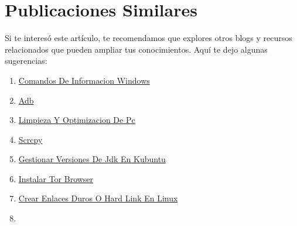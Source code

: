 \documentclass[
  jou,
  floatsintext,
  longtable,
  a4paper,
  nolmodern,
  notxfonts,
  notimes,
  12pt,
  colorlinks=true,linkcolor=blue,citecolor=blue,urlcolor=blue]{apa7}
\providecommand{\tightlist}{%
  \setlength{\itemsep}{0pt}\setlength{\parskip}{0pt}}
\begin{document}
\section{Publicaciones Similares}\label{publicaciones-similares}

Si te interesó este artículo, te recomendamos que explores otros blogs y
recursos relacionados que pueden ampliar tus conocimientos. Aquí te dejo
algunas sugerencias:

\begin{enumerate}
\def\labelenumi{\arabic{enumi}.}
\tightlist
\item
  \href{https://chaska-x.netlify.app/operating-system/2017-05-21-comandos-de-informacion-windows/index.pdf}{}
  \href{https://chaska-x.netlify.app/operating-system/2017-05-21-comandos-de-informacion-windows}{Comandos
  De Informacion Windows}
\item
  \href{https://chaska-x.netlify.app/operating-system/2019-06-19-adb/index.pdf}{}
  \href{https://chaska-x.netlify.app/operating-system/2019-06-19-adb}{Adb}
\item
  \href{https://chaska-x.netlify.app/operating-system/2021-08-17-limpieza-y-optimizacion-de-pc/index.pdf}{}
  \href{https://chaska-x.netlify.app/operating-system/2021-08-17-limpieza-y-optimizacion-de-pc}{Limpieza
  Y Optimizacion De Pc}
\item
  \href{https://chaska-x.netlify.app/operating-system/2021-10-21-scrcpy/index.pdf}{}
  \href{https://chaska-x.netlify.app/operating-system/2021-10-21-scrcpy}{Scrcpy}
\item
  \href{https://chaska-x.netlify.app/operating-system/2022-05-12-gestionar-versiones-de-jdk-en-kubuntu/index.pdf}{}
  \href{https://chaska-x.netlify.app/operating-system/2022-05-12-gestionar-versiones-de-jdk-en-kubuntu}{Gestionar
  Versiones De Jdk En Kubuntu}
\item
  \href{https://chaska-x.netlify.app/operating-system/2022-07-21-instalar-tor-browser/index.pdf}{}
  \href{https://chaska-x.netlify.app/operating-system/2022-07-21-instalar-tor-browser}{Instalar
  Tor Browser}
\item
  \href{https://chaska-x.netlify.app/operating-system/2022-08-14-crear-enlaces-duros-o-hard-link-en-linux/index.pdf}{}
  \href{https://chaska-x.netlify.app/operating-system/2022-08-14-crear-enlaces-duros-o-hard-link-en-linux}{Crear
  Enlaces Duros O Hard Link En Linux}
\item

\end{enumerate}
\end{document}
